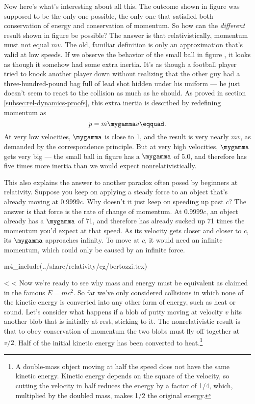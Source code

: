 Now here's what's interesting about all this. The outcome shown in figure 
was supposed to be the only one possible, the only one that satisfied both conservation of energy
and conservation of momentum. So how can the \emph{different} result shown in figure
 be possible? The answer is that relativistically, momentum must not equal
$mv$. The old, familiar definition is only an approximation that's valid at low speeds. If
we observe the behavior of the small ball in figure , it looks as though it
somehow had some extra inertia. It's as though a football player tried to knock another player
down without realizing that the other guy had a three-hundred-pound bag full of lead shot
hidden under his uniform --- he just doesn't seem to react to the collision as much as he should.
As proved in section \ref{subsec:rel-dynamics-proofs},
this extra inertia is described by redefining momentum as
\begin{equation*}
        p = m \mygamma v\eqquad.
\end{equation*}
At very low velocities, $\mygamma$ is close to 1, and the result is very nearly $mv$, as demanded
by the correspondence principle. But at very high velocities, $\mygamma$ gets very big --- the
small ball in figure  has a $\mygamma$ of 5.0, and therefore has five times
more inertia than we would expect nonrelativistically.

This also explains the answer to another paradox often posed by beginners at relativity.
Suppose you keep on applying a steady force to an object that's already moving at $0.9999c$.
Why doesn't it just keep on speeding up past $c$? The answer is that force is the rate of
change of momentum. At $0.9999c$, an object already has a $\mygamma$ of 71, and therefore
has already sucked up 71 times the momentum you'd expect at that speed. As its velocity gets closer and
closer to $c$, its $\mygamma$ approaches infinity. To move at $c$, it would need an infinite
momentum, which could only be caused by an infinite force.

m4_include(../share/relativity/eg/bertozzi.tex)

<%
<%
Now we're ready to see why mass and energy must be equivalent as claimed
in the famous $E=mc^2$. So far we've only considered collisions
in which none of the kinetic energy is converted into any other form
of energy, such as heat or sound.
Let's consider what happens if a blob of putty moving at
velocity $v$ hits another blob that is initially at rest,
sticking to it.  The nonrelativistic result is
that to obey conservation of momentum the two blobs must fly
off together at $v/2$. Half of the initial kinetic energy
has been converted to heat.\footnote{A double-mass object moving
at half the speed does not have the same kinetic energy. Kinetic
energy depends on the square of the velocity, so cutting the velocity
in half reduces the energy by a factor of 1/4, which, multiplied
by the doubled mass, makes 1/2 the original energy.}

